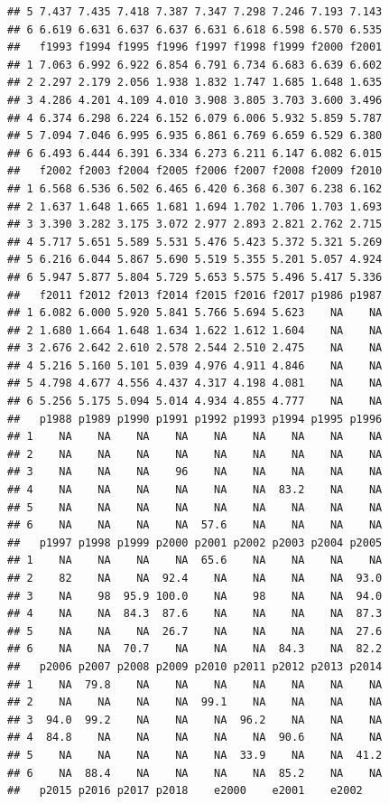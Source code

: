 \documentclass[
]{book}
\begin{document}
\begin{verbatim}
## 5 7.437 7.435 7.418 7.387 7.347 7.298 7.246 7.193 7.143
## 6 6.619 6.631 6.637 6.637 6.631 6.618 6.598 6.570 6.535
##   f1993 f1994 f1995 f1996 f1997 f1998 f1999 f2000 f2001
## 1 7.063 6.992 6.922 6.854 6.791 6.734 6.683 6.639 6.602
## 2 2.297 2.179 2.056 1.938 1.832 1.747 1.685 1.648 1.635
## 3 4.286 4.201 4.109 4.010 3.908 3.805 3.703 3.600 3.496
## 4 6.374 6.298 6.224 6.152 6.079 6.006 5.932 5.859 5.787
## 5 7.094 7.046 6.995 6.935 6.861 6.769 6.659 6.529 6.380
## 6 6.493 6.444 6.391 6.334 6.273 6.211 6.147 6.082 6.015
##   f2002 f2003 f2004 f2005 f2006 f2007 f2008 f2009 f2010
## 1 6.568 6.536 6.502 6.465 6.420 6.368 6.307 6.238 6.162
## 2 1.637 1.648 1.665 1.681 1.694 1.702 1.706 1.703 1.693
## 3 3.390 3.282 3.175 3.072 2.977 2.893 2.821 2.762 2.715
## 4 5.717 5.651 5.589 5.531 5.476 5.423 5.372 5.321 5.269
## 5 6.216 6.044 5.867 5.690 5.519 5.355 5.201 5.057 4.924
## 6 5.947 5.877 5.804 5.729 5.653 5.575 5.496 5.417 5.336
##   f2011 f2012 f2013 f2014 f2015 f2016 f2017 p1986 p1987
## 1 6.082 6.000 5.920 5.841 5.766 5.694 5.623    NA    NA
## 2 1.680 1.664 1.648 1.634 1.622 1.612 1.604    NA    NA
## 3 2.676 2.642 2.610 2.578 2.544 2.510 2.475    NA    NA
## 4 5.216 5.160 5.101 5.039 4.976 4.911 4.846    NA    NA
## 5 4.798 4.677 4.556 4.437 4.317 4.198 4.081    NA    NA
## 6 5.256 5.175 5.094 5.014 4.934 4.855 4.777    NA    NA
##   p1988 p1989 p1990 p1991 p1992 p1993 p1994 p1995 p1996
## 1    NA    NA    NA    NA    NA    NA    NA    NA    NA
## 2    NA    NA    NA    NA    NA    NA    NA    NA    NA
## 3    NA    NA    NA    96    NA    NA    NA    NA    NA
## 4    NA    NA    NA    NA    NA    NA  83.2    NA    NA
## 5    NA    NA    NA    NA    NA    NA    NA    NA    NA
## 6    NA    NA    NA    NA  57.6    NA    NA    NA    NA
##   p1997 p1998 p1999 p2000 p2001 p2002 p2003 p2004 p2005
## 1    NA    NA    NA    NA  65.6    NA    NA    NA    NA
## 2    82    NA    NA  92.4    NA    NA    NA    NA  93.0
## 3    NA    98  95.9 100.0    NA    98    NA    NA  94.0
## 4    NA    NA  84.3  87.6    NA    NA    NA    NA  87.3
## 5    NA    NA    NA  26.7    NA    NA    NA    NA  27.6
## 6    NA    NA  70.7    NA    NA    NA  84.3    NA  82.2
##   p2006 p2007 p2008 p2009 p2010 p2011 p2012 p2013 p2014
## 1    NA  79.8    NA    NA    NA    NA    NA    NA    NA
## 2    NA    NA    NA    NA  99.1    NA    NA    NA    NA
## 3  94.0  99.2    NA    NA    NA  96.2    NA    NA    NA
## 4  84.8    NA    NA    NA    NA    NA  90.6    NA    NA
## 5    NA    NA    NA    NA    NA  33.9    NA    NA  41.2
## 6    NA  88.4    NA    NA    NA    NA  85.2    NA    NA
##   p2015 p2016 p2017 p2018    e2000    e2001    e2002

\end{verbatim}
\end{document}
